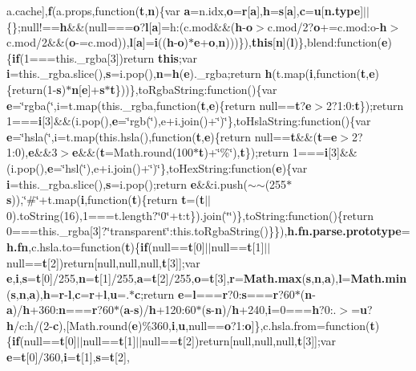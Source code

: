 {{a.\+cache}\mbox{]},{\bf f}(a.\+props,function({\bf t},{\bf n})\{var {\bf a}=n.\+idx,{\bf o}={\bf r}\mbox{[}{\bf a}\mbox{]},{\bf h}={\bf s}\mbox{[}{\bf a}\mbox{]},{\bf c}={\bf u}\mbox{[}{\bf n.\+type}\mbox{]}$\vert$$\vert$\{\};null!=={\bf h}\&\&(null==={\bf o}?{\bf l}\mbox{[}{\bf a}\mbox{]}=h\+:(c.\+mod\&\&({\bf h}-\/{\bf o}$>$c.\+mod/2?{\bf o}+=c.\+mod\+:o-\/{\bf h}$>$c.\+mod/2\&\&({\bf o}-\/=c.\+mod)),{\bf l}\mbox{[}{\bf a}\mbox{]}={\bf i}(({\bf h}-\/{\bf o})$\ast${\bf e}+{\bf o},{\bf n})))\}),{\bf this}\mbox{[}{\bf n}\mbox{]}({\bf l})\},blend\+:function({\bf e})\{{\bf if}(1===this.\+\_\+rgba\mbox{[}3\mbox{]})return {\bf this};var {\bf i}=this.\+\_\+rgba.\+slice(),{\bf s}=i.\+pop(),{\bf n}={\bf h}({\bf e}).\+\_\+rgba;return {\bf h}(t.\+map({\bf i},function({\bf t},{\bf e})\{return(1-\/{\bf s})$\ast${\bf n}\mbox{[}{\bf e}\mbox{]}+{\bf s}$\ast${\bf t}\}))\},to\+Rgba\+String\+:function()\{var {\bf e}=\char`\"{}rgba(\char`\"{},i=t.\+map(this.\+\_\+rgba,function({\bf t},{\bf e})\{return null=={\bf t}?{\bf e}$>$2?1\+:0\+:{\bf t}\});return 1==={\bf i}\mbox{[}3\mbox{]}\&\&(i.\+pop(),{\bf e}=\char`\"{}rgb(\char`\"{}),e+i.\+join()+\char`\"{})\char`\"{}\},to\+Hsla\+String\+:function()\{var {\bf e}=\char`\"{}hsla(\char`\"{},i=t.\+map(this.\+hsla(),function({\bf t},{\bf e})\{return null=={\bf t}\&\&({\bf t}={\bf e}$>$2?1\+:0),{\bf e}\&\&3$>${\bf e}\&\&({\bf t}=Math.\+round(100$\ast${\bf t})+\char`\"{}\%\char`\"{}),{\bf t}\});return 1==={\bf i}\mbox{[}3\mbox{]}\&\&(i.\+pop(),{\bf e}=\char`\"{}hsl(\char`\"{}),e+i.\+join()+\char`\"{})\char`\"{}\},to\+Hex\+String\+:function({\bf e})\{var {\bf i}=this.\+\_\+rgba.\+slice(),{\bf s}=i.\+pop();return {\bf e}\&\&i.\+push($\sim$$\sim$(255$\ast${\bf s})),\char`\"{}\#\char`\"{}+t.\+map({\bf i},function({\bf t})\{return {\bf t}=({\bf t}$\vert$$\vert$0).to\+String(16),1===t.\+length?\char`\"{}0\char`\"{}+t\+:t\}).join(\char`\"{}\char`\"{})\},to\+String\+:function()\{return 0===this.\+\_\+rgba\mbox{[}3\mbox{]}?\char`\"{}transparent\char`\"{}\+:this.\+to\+Rgba\+String()\}\}),{\bf h.\+fn.\+parse.\+prototype}={\bf h.\+fn},c.\+hsla.\+to=function({\bf t})\{{\bf if}(null=={\bf t}\mbox{[}0\mbox{]}$\vert$$\vert$null=={\bf t}\mbox{[}1\mbox{]}$\vert$$\vert$null=={\bf t}\mbox{[}2\mbox{]})return\mbox{[}null,null,null,{\bf t}\mbox{[}3\mbox{]}\mbox{]};var {\bf e},{\bf i},{\bf s}={\bf t}\mbox{[}0\mbox{]}/255,{\bf n}={\bf t}\mbox{[}1\mbox{]}/255,{\bf a}={\bf t}\mbox{[}2\mbox{]}/255,{\bf o}={\bf t}\mbox{[}3\mbox{]},{\bf r}={\bf Math.\+max}({\bf s},{\bf n},{\bf a}),{\bf l}={\bf Math.\+min}({\bf s},{\bf n},{\bf a}),{\bf h}={\bf r}-\/{\bf l},{\bf c}={\bf r}+{\bf l},{\bf u}=.$\ast${\bf c};return {\bf e}={\bf l}==={\bf r}?0\+:{\bf s}==={\bf r}?60$\ast$({\bf n}-\/{\bf a})/{\bf h}+360\+:{\bf n}==={\bf r}?60$\ast$({\bf a}-\/{\bf s})/{\bf h}+120\+:60$\ast$({\bf s}-\/{\bf n})/{\bf h}+240,{\bf i}=0==={\bf h}?0\+:.$>$={\bf u}?{\bf h}/c\+:h/(2-\/{\bf c}),\mbox{[}Math.\+round({\bf e})\%360,{\bf i},{\bf u},null=={\bf o}?1\+:{\bf o}\mbox{]}\},c.\+hsla.\+from=function({\bf t})\{{\bf if}(null=={\bf t}\mbox{[}0\mbox{]}$\vert$$\vert$null=={\bf t}\mbox{[}1\mbox{]}$\vert$$\vert$null=={\bf t}\mbox{[}2\mbox{]})return\mbox{[}null,null,null,{\bf t}\mbox{[}3\mbox{]}\mbox{]};var {\bf e}={\bf t}\mbox{[}0\mbox{]}/360,{\bf i}={\bf t}\mbox{[}1\mbox{]},{\bf s}={\bf t}\mbox{[}2\mbox{]},{\bf }}
